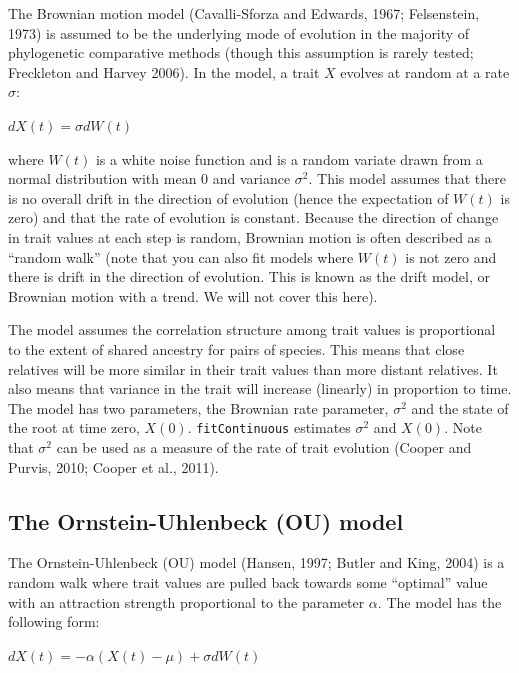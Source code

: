 \documentclass[]{book}
\begin{document}
The Brownian motion model (Cavalli-Sforza and Edwards, 1967;
Felsenstein, 1973) is assumed to be the underlying mode of evolution in
the majority of phylogenetic comparative methods (though this assumption
is rarely tested; Freckleton and Harvey 2006). In the model, a trait
\(X\) evolves at random at a rate \(\sigma\):

\(dX(t) = \sigma dW(t)\)

where \(W(t)\) is a white noise function and is a random variate drawn
from a normal distribution with mean 0 and variance \(\sigma^2\). This
model assumes that there is no overall drift in the direction of
evolution (hence the expectation of \(W(t)\) is zero) and that the rate
of evolution is constant. Because the direction of change in trait
values at each step is random, Brownian motion is often described as a
``random walk'' (note that you can also fit models where \(W(t)\) is not
zero and there is drift in the direction of evolution. This is known as
the drift model, or Brownian motion with a trend. We will not cover this
here).

The model assumes the correlation structure among trait values is
proportional to the extent of shared ancestry for pairs of species. This
means that close relatives will be more similar in their trait values
than more distant relatives. It also means that variance in the trait
will increase (linearly) in proportion to time. The model has two
parameters, the Brownian rate parameter, \(\sigma^2\) and the state of
the root at time zero, \(X(0)\). \texttt{fitContinuous} estimates
\(\sigma^2\) and \(X(0)\). Note that \(\sigma^2\) can be used as a
measure of the rate of trait evolution (Cooper and Purvis, 2010; Cooper
et al., 2011).

\subsection{The Ornstein-Uhlenbeck (OU)
model}\label{the-ornstein-uhlenbeck-ou-model}

The Ornstein-Uhlenbeck (OU) model (Hansen, 1997; Butler and King, 2004)
is a random walk where trait values are pulled back towards some
``optimal'' value with an attraction strength proportional to the
parameter \(\alpha\). The model has the following form:

\(dX(t) = -\alpha(X(t) - \mu) + \sigma dW(t)\)
\end{document}

